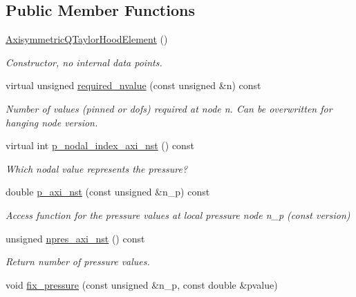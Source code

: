 \subsection*{Public Member Functions}
\begin{DoxyCompactItemize}
\item 
\hyperlink{classoomph_1_1AxisymmetricQTaylorHoodElement_ac6b80d9619833e670b80cafff35f3739}{Axisymmetric\+Q\+Taylor\+Hood\+Element} ()
\begin{DoxyCompactList}\small\item\em Constructor, no internal data points. \end{DoxyCompactList}\item 
virtual unsigned \hyperlink{classoomph_1_1AxisymmetricQTaylorHoodElement_a89c18769297b69e2e3522d83c8b68d73}{required\+\_\+nvalue} (const unsigned \&n) const
\begin{DoxyCompactList}\small\item\em Number of values (pinned or dofs) required at node n. Can be overwritten for hanging node version. \end{DoxyCompactList}\item 
virtual int \hyperlink{classoomph_1_1AxisymmetricQTaylorHoodElement_a318c767e20198f6d3f8a5c788df31055}{p\+\_\+nodal\+\_\+index\+\_\+axi\+\_\+nst} () const
\begin{DoxyCompactList}\small\item\em Which nodal value represents the pressure? \end{DoxyCompactList}\item 
double \hyperlink{classoomph_1_1AxisymmetricQTaylorHoodElement_aec113045099e51a61a1624b0126a05b1}{p\+\_\+axi\+\_\+nst} (const unsigned \&n\+\_\+p) const
\begin{DoxyCompactList}\small\item\em Access function for the pressure values at local pressure node n\+\_\+p (const version) \end{DoxyCompactList}\item 
unsigned \hyperlink{classoomph_1_1AxisymmetricQTaylorHoodElement_a636d0c75c75483f9da193d0192f4e05e}{npres\+\_\+axi\+\_\+nst} () const
\begin{DoxyCompactList}\small\item\em Return number of pressure values. \end{DoxyCompactList}\item 
void \hyperlink{classoomph_1_1AxisymmetricQTaylorHoodElement_a1557e286a76d63d79aabef3493cf0af2}{fix\+\_\+pressure} (const unsigned \&n\+\_\+p, const double \&pvalue)

\end{DoxyCompactItemize}

